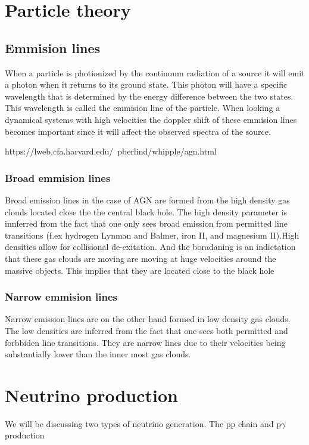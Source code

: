 \documentclass{article}
\begin{document}
\section{Particle theory}

\subsection{Emmision lines}
When a particle is photionized by the continuum radiation of a source it will emit a photon when it returns to its ground state. 
This photon will have a specific wavelength that is determined by the energy difference between the two states.
This wavelength is called the emmision line of the particle. When looking a dynamical systems with high velocities 
the doppler shift of these emmision lines becomes important since it will affect the observed spectra of the source.

https://lweb.cfa.harvard.edu/~pberlind/whipple/agn.html



\subsubsection{Broad emmision lines}
Broad emission lines in the case of AGN are formed from the high density gas clouds located close the the central black hole. The 
high density parameter is innferred from the fact that one only sees broad emission from permitted line transitions (f.ex hydrogen Lynman and Balmer,
iron II, and magnesium II).High densities allow for collisional de-exitation. And the boradaning is an indictation that these gas clouds are moving are moving 
at huge velocities around the massive objects. This implies that they are located close to the black hole
\subsubsection{Narrow emmision lines}
Narrow emission lines are on the other hand formed in low density gas clouds. The low densities are inferred from the fact that one sees
both permitted and forbbiden line transitions. They are narrow lines due to their velocities being substantially lower than the inner most gas clouds.

\section{Neutrino production}

We will be discussing two types of neutrino generation. The pp chain and p$\gamma$ production
\end{document}
